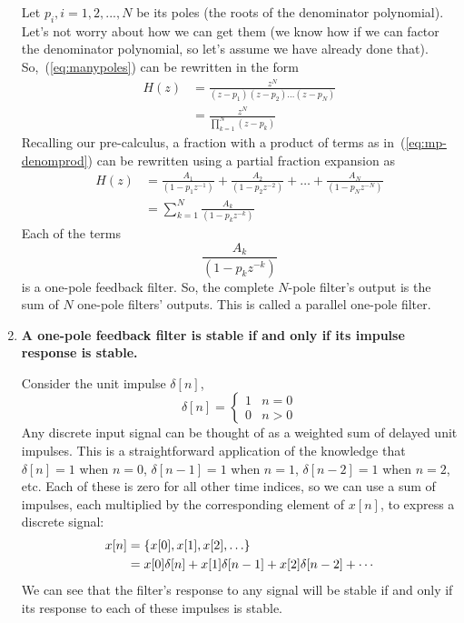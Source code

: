 \begin{enumerate}
Let $p_i, i=1, 2,...,N$ be its poles (the roots of the denominator
polynomial). Let's not worry about how we can get them (we know how if
we can factor the denominator polynomial, so let's assume we have
already done that).  So,~(\ref{eq:manypoles}) can be rewritten in the
form
\begin{align}
H(z) &= \frac{z^N}{(z-p_1)(z-p_2)\hdots (z-p_N)}\\
     &= \frac{z^N}{\prod_{k=1}^N(z-p_k)}\label{eq:mp-denomprod}
\end{align}
Recalling our pre-calculus, a fraction with a product of terms as
in~(\ref{eq:mp-denomprod}) can be rewritten using a partial fraction
expansion as 
\begin{align}
H(z) &= \frac{A_1}{(1-p_1z^{-1})}+\frac{A_2}{(1-p_2z^{-2})}+\hdots +
\frac{A_N}{(1-p_Nz^{-N})}\\
&= \sum_{k=1}^N\frac{A_k}{(1-p_k z^{-k})}
\end{align}
Each of the terms
\begin{equation}
\frac{A_k}{(1-p_k z^{-k})}
\end{equation}
is a one-pole feedback filter. So, the complete $N$-pole filter's
output is the sum of $N$ one-pole filters' outputs. This is called a
parallel one-pole filter.

\item \textbf{A one-pole feedback filter is stable if and only if its
impulse response is stable.}

Consider the unit impulse $\delta[n]$,
\begin{equation}
\delta[n] = 
\left\{\begin{array}{rl}
1 & n=0\\
0 & n>0
\end{array}\right.
\end{equation}
Any discrete input signal can be thought of as a weighted sum of
delayed unit impulses. This is a straightforward application of the
knowledge that $\delta[n]=1$ when $n=0$,  $\delta[n-1]=1$  when $n=1$,
$\delta[n-2]=1$ when $n=2$, etc. Each of these is zero for all other
time indices, so we can use a sum of impulses, each multiplied by the
corresponding element of $x[n]$, to express a discrete signal:
\begin{align}
x[n] &= \{x[0], x[1], x[2], \ldots\} \notag \\
     &= x[0]\delta[n] + x[1]\delta[n-1] + x[2]\delta[n-2] + \cdots
\end{align}
We can see that the filter's response to any signal will be stable if
and only if its response to each of these impulses is stable.


\end{enumerate}
